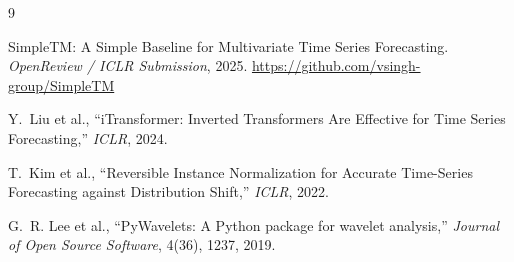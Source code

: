 \documentclass[12pt,a4paper]{article}
\begin{document}
\begin{thebibliography}{9}

SimpleTM: A Simple Baseline for Multivariate Time Series Forecasting.
\textit{OpenReview / ICLR Submission}, 2025.
\url{https://github.com/vsingh-group/SimpleTM}

Y.~Liu et al.,
``iTransformer: Inverted Transformers Are Effective for Time Series Forecasting,''
\textit{ICLR}, 2024.

T.~Kim et al.,
``Reversible Instance Normalization for Accurate Time-Series Forecasting against Distribution Shift,''
\textit{ICLR}, 2022.

G.~R. Lee et al.,
``PyWavelets: A Python package for wavelet analysis,''
\textit{Journal of Open Source Software}, 4(36), 1237, 2019.

\end{thebibliography}
\end{document}
